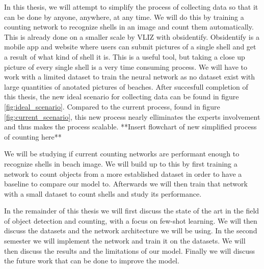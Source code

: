 In this thesis, we will attempt to simplify the process of collecting data so that it can be done by anyone, anywhere, at any time. We will do this by training a counting network to recognize shells in an image and count them automatically. This is already done on a smaller scale by VLIZ with obsidentify. Obsidentify is a mobile app and website where users can submit pictures of a single shell and get a result of what kind of shell it is. This is a useful tool, but taking a close up picture of every single shell is a very time consuming process. We will have to work with a limited dataset to train the neural network as no dataset exist with large quantities of anotated pictures of beaches. After succesfull completion of this thesis, the new ideal scenario for collecting data can be found in figure \ref{fig:ideal_scenario}. Compared to the current process, found in figure \ref{fig:current_scenario}, this new process nearly elliminates the experts involvement and thus makes the process scalable.
**Insert flowchart of new simplified process of counting here**

We will be studying if current counting networks are performant enough to recognize shells in beach image. We will build up to this by first training a network to count objects from a more established dataset in order to have a baseline to compare our model to. Afterwards we will then train that network with a small dataset to count shells and study its performance. 

In the remainder of this thesis we will first discuss the state of the art in the field of object detection and counting, with a focus on few-shot learning. We will then discuss the datasets and the network architecture we will be using. In the second semester we will implement the network and train it on the datasets. We will then discuss the results and the limitations of our model. Finally we will discuss the future work that can be done to improve the model.
